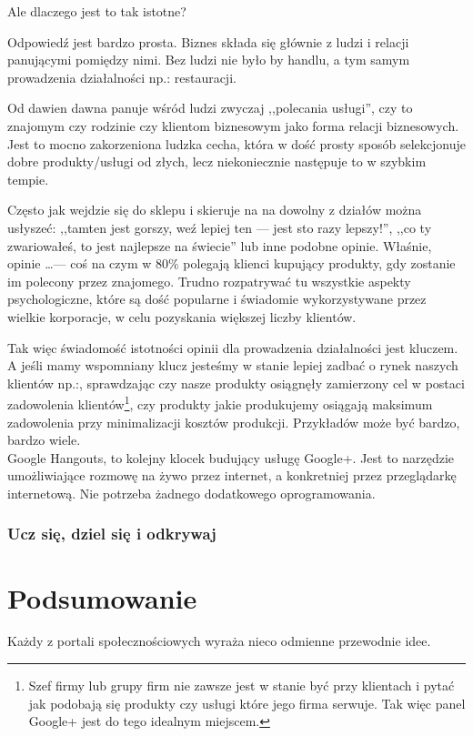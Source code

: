 Ale dlaczego jest to tak istotne?

Odpowiedź jest bardzo prosta. Biznes składa się głównie z ludzi i relacji panującymi pomiędzy nimi. Bez ludzi nie było by handlu, a tym samym prowadzenia działalności np.: restauracji.

Od dawien dawna panuje wśród ludzi zwyczaj ,,polecania usługi'', czy to znajomym czy rodzinie czy klientom biznesowym jako forma relacji biznesowych. Jest to mocno zakorzeniona ludzka cecha, która w dość prosty sposób selekcjonuje dobre produkty/usługi od złych, lecz niekoniecznie następuje to w szybkim tempie.

Często jak wejdzie się do sklepu i skieruje na na dowolny z działów można usłyszeć: ,,tamten jest gorszy, weź lepiej ten --- jest sto razy lepszy!'', ,,co ty zwariowałeś, to jest najlepsze na świecie'' lub inne podobne opinie. Właśnie, opinie \dots --- coś na czym w 80\% polegają klienci kupujący produkty, gdy zostanie im polecony przez znajomego. Trudno rozpatrywać tu wszystkie aspekty psychologiczne, które są dość popularne i świadomie wykorzystywane przez wielkie korporacje, w celu pozyskania większej liczby klientów.

Tak więc świadomość istotności opinii dla prowadzenia działalności jest kluczem. A jeśli mamy wspomniany klucz jesteśmy w stanie lepiej zadbać o rynek naszych klientów np.:, sprawdzając czy nasze produkty osiągnęły zamierzony cel w postaci zadowolenia klientów\footnote{Szef firmy lub grupy firm nie zawsze jest w stanie być przy klientach i pytać jak podobają się produkty czy usługi które jego firma serwuje. Tak więc panel Google+ jest do tego idealnym miejscem.}, czy produkty jakie produkujemy osiągają maksimum zadowolenia przy minimalizacji kosztów produkcji. Przykładów może być bardzo, bardzo wiele.\\

Google Hangouts, to kolejny klocek budujący usługę Google+. Jest to narzędzie umożliwiające rozmowę na żywo przez internet, a konkretniej przez przeglądarkę internetową. Nie potrzeba żadnego dodatkowego oprogramowania.


\subsubsection{Ucz się, dziel się i odkrywaj}


\clearpage
\section{Podsumowanie}

Każdy z portali społecznościowych wyraża nieco odmienne przewodnie idee. 
